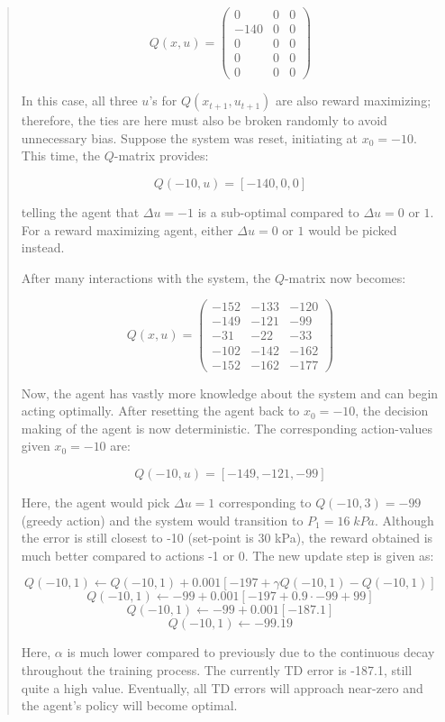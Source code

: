 \begin{quote}
    $$ Q(x, u) = \left(\begin{matrix}   0  &  0  & 0 \\
                                        -140 & 0 & 0 \\
                                        0 & 0 & 0 \\
                                        0 & 0 & 0 \\
                                        0 & 0 & 0 \end{matrix}\right) $$
                                        
    In this case, all three $u$'s for $Q(x_{t+1}, u_{t+1})$ are also reward maximizing; therefore, the ties are here must also be broken randomly to avoid unnecessary bias. Suppose the system was reset, initiating at $x_0 = -10$.  This time, the $Q$-matrix provides:
    
    $$Q(-10, u) = [-140, 0, 0]$$
    
    telling the agent that $\Delta u = -1$ is a sub-optimal compared to $\Delta u = 0 \text{ or } 1$.  For a reward maximizing agent, either $\Delta u = 0 \text{ or } 1$ would be picked instead.  
    
    After many interactions with the system, the $Q$-matrix now becomes:
    
        $$ Q(x, u) = \left(\begin{matrix}   -152  &  -133  & -120 \\
                                        -149 & -121 & -99 \\
                                        -31 & -22 & -33 \\
                                        -102 & -142 & -162 \\
                                        -152 & -162 & -177 \end{matrix}\right) $$
    
    Now, the agent has vastly more knowledge about the system and can begin acting optimally. After resetting the agent back to $x_0 = -10$, the decision making of the agent is now deterministic.  The corresponding action-values given $x_0 = -10$ are:
    
    $$Q(-10, u) = [-149, -121, -99]$$
    
    Here, the agent would pick $\Delta u = 1$ corresponding to $Q(-10, 3) = -99$ (greedy action) and the system would transition to $P_1 = 16 \; kPa$.  Although the error is still closest to -10 (set-point is 30 kPa), the reward obtained is much better compared to actions -1 or 0.  The new update step is given as:
    
    $$Q(-10, 1) \leftarrow Q(-10, 1) + 0.001 [-197 + \gamma Q(-10, 1) - Q(-10, 1)]$$
    $$Q(-10, 1) \leftarrow -99 + 0.001 [-197 + 0.9 \cdot -99 + 99]$$
    $$Q(-10, 1) \leftarrow -99 + 0.001 [-187.1]$$
    $$Q(-10, 1) \leftarrow -99.19 $$
    
    Here, $\alpha$ is much lower compared to previously due to the continuous decay throughout the training process. The currently TD error is -187.1, still quite a high value.  Eventually, all TD errors will approach near-zero and the agent's policy will become optimal.
\end{quote}


